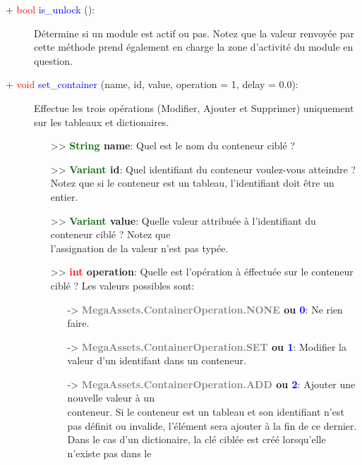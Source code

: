 \documentclass[a4paper, 11pt]{article}
\begin{document}
	\begin{description}
		\item [+ \textcolor{red}{bool} \textcolor{blue}{is\_unlock} ():] Détermine si un module est actif ou
		pas. Notez que la valeur renvoyée par cette méthode prend également en charge la zone d'activité du
		module en question.\\
	\end{description}
	\begin{description}
		\item [+ \textcolor{red}{void} \textcolor{blue}{set\_container} (name, id, value, operation = 1,
		delay = 0.0):] Effectue les trois opérations (Modifier, Ajouter et Supprimer) uniquement sur les 
		tableaux et dictionaires.
		\begin{itemize}
			\item [>> \textbf{\textcolor{darkgreen}{String} name}:] Quel est le nom du conteneur ciblé ?
			\item [>> \textbf{\textcolor{darkgreen}{Variant} id}:] Quel identifiant du conteneur voulez-vous 
			atteindre ? Notez que si le conteneur est un tableau, l'identifiant doit être un entier.
			\item [>> \textbf{\textcolor{darkgreen}{Variant} value}:] Quelle valeur attribuée à
			l'identifiant du conteneur ciblé ? Notez que \\l'assignation de la valeur n'est pas typée.
			\item [>> \textbf{\textcolor{red}{int} operation}:] Quelle est l'opération à éffectuée sur le
			conteneur ciblé ? Les valeurs possibles sont:
			 \begin{itemize}
			   	\item [-> \textbf{\textcolor{gray}{MegaAssets.ContainerOperation.NONE} ou \textcolor{blue}
			   	{0}}:] Ne rien faire.
				\item [-> \textbf{\textcolor{gray}{MegaAssets.ContainerOperation.SET} ou \textcolor{blue}
				{1}}:] Modifier la valeur d'un identifant dans un conteneur.
				\item [-> \textbf{\textcolor{gray}{MegaAssets.ContainerOperation.ADD} ou \textcolor{blue}
				{2}}:] Ajouter une nouvelle valeur à un \\conteneur. Si le conteneur est un tableau et son 
				identifiant n'est pas définit ou invalide, l'élément sera ajouter à la fin de ce dernier. 
				Dans le cas d'un dictionaire, la clé ciblée est créé lorsqu'elle n'existe pas dans le

\end{itemize}
\end{itemize}
\end{description}
\end{document}
